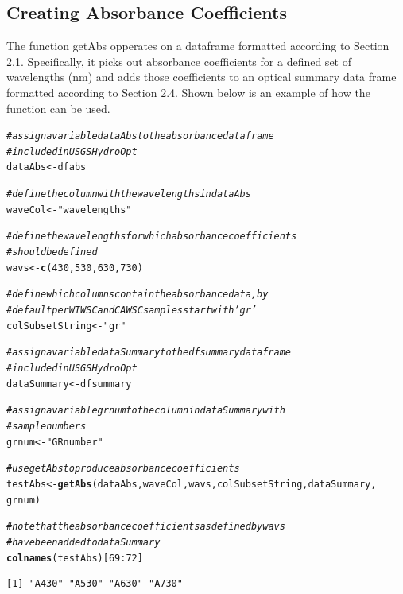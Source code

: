 \documentclass[a4paper,11pt]{article}\usepackage[]{graphicx}\usepackage[]{color}
\makeatletter
\newcommand{\hlnum}[1]{\textcolor[rgb]{0.686,0.059,0.569}{#1}}%
\newcommand{\hlstr}[1]{\textcolor[rgb]{0.192,0.494,0.8}{#1}}%
\newcommand{\hlcom}[1]{\textcolor[rgb]{0.678,0.584,0.686}{\textit{#1}}}%
\newcommand{\hlopt}[1]{\textcolor[rgb]{0,0,0}{#1}}%
\newcommand{\hlstd}[1]{\textcolor[rgb]{0.345,0.345,0.345}{#1}}%
\newcommand{\hlkwb}[1]{\textcolor[rgb]{0.69,0.353,0.396}{#1}}%
\newcommand{\hlkwd}[1]{\textcolor[rgb]{0.737,0.353,0.396}{\textbf{#1}}}%
\newenvironment{kframe}{%
 \def\at@end@of@kframe{}%
 \ifinner\ifhmode%
  \def\at@end@of@kframe{\end{minipage}}%
  \begin{minipage}{\columnwidth}%
 \fi\fi%
 \def\FrameCommand##1{\hskip\@totalleftmargin \hskip-\fboxsep
 \colorbox{shadecolor}{##1}\hskip-\fboxsep
     \hskip-\linewidth \hskip-\@totalleftmargin \hskip\columnwidth}%
 \MakeFramed {\advance\hsize-\width
   \@totalleftmargin\z@ \linewidth\hsize
   \@setminipage}}%
 {\par\unskip\endMakeFramed%
 \at@end@of@kframe}
\newenvironment{knitrout}{}{} %
\makeatother
\begin{document}
\subsection{Creating Absorbance Coefficients}
The function getAbs opperates on a dataframe formatted according to Section 2.1. Specifically, it picks out absorbance coefficients for a defined set of wavelengths (nm) and adds those coefficients to an optical summary data frame formatted according to Section 2.4. Shown below is an example of how the function can be used.

\begin{knitrout}
\color{fgcolor}\begin{kframe}
\begin{alltt}
\hlcom{# assign a variable dataAbs to the absorbance dataframe}
\hlcom{# included in USGSHydroOpt}
\hlstd{dataAbs} \hlkwb{<-} \hlstd{dfabs}

\hlcom{# define the column with the wavelengths in dataAbs}
\hlstd{waveCol} \hlkwb{<-} \hlstr{"wavelengths"}

\hlcom{# define the wavelengths for which absorbance coefficients}
\hlcom{# should be defined}
\hlstd{wavs} \hlkwb{<-} \hlkwd{c}\hlstd{(}\hlnum{430}\hlstd{,} \hlnum{530}\hlstd{,} \hlnum{630}\hlstd{,} \hlnum{730}\hlstd{)}

\hlcom{# define which columns contain the absorbance data, by}
\hlcom{# default per WI WSC and CA WSC samples start with 'gr'}
\hlstd{colSubsetString} \hlkwb{<-} \hlstr{"gr"}

\hlcom{# assign a variable dataSummary to the dfsummary dataframe}
\hlcom{# included in USGSHydroOpt}
\hlstd{dataSummary} \hlkwb{<-} \hlstd{dfsummary}

\hlcom{# assign a variable grnum to the column in dataSummary with}
\hlcom{# sample numbers}
\hlstd{grnum} \hlkwb{<-} \hlstr{"GRnumber"}

\hlcom{# use getAbs to produce absorbance coefficients}
\hlstd{testAbs} \hlkwb{<-} \hlkwd{getAbs}\hlstd{(dataAbs, waveCol, wavs, colSubsetString, dataSummary,}
    \hlstd{grnum)}

\hlcom{# note that the absorbance coefficients as defined by wavs}
\hlcom{# have been added to dataSummary}
\hlkwd{colnames}\hlstd{(testAbs)[}\hlnum{69}\hlopt{:}\hlnum{72}\hlstd{]}
\end{alltt}
\begin{verbatim}
[1] "A430" "A530" "A630" "A730"
\end{verbatim}
\end{kframe}
\end{knitrout}
\end{document}
